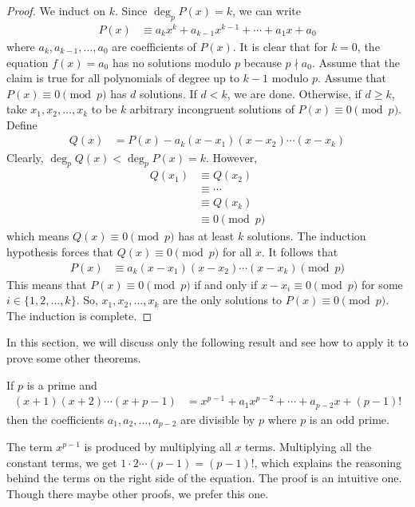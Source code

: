 	\begin{proof}
		We induct on $k$. Since $\deg_p P(x) = k$, we can write
			\begin{align*}
				P(x)
					& \equiv a_kx^k + a_{k-1}x^{k-1} + \cdots + a_1 x +a_0
			\end{align*}
		where $a_k, a_{k-1}, \ldots, a_0$ are coefficients of $P(x)$. It is clear that for $k=0$, the equation $f(x)=a_0$ has no solutions modulo $p$ because $p \nmid a_0$. Assume that the claim is true for all polynomials of degree up to $k-1$ modulo $p$. Assume that $P(x) \equiv 0 \pmod p$ has $d$ solutions. If $d < k$, we are done. Otherwise, if $d\geq k$, take $x_1, x_2, \ldots, x_k$ to be $k$ arbitrary incongruent solutions of $P(x) \equiv 0 \pmod p$. Define
			\begin{align*}
				Q(x)
					& = P(x) - a_k(x-x_1)(x-x_2)\cdots (x-x_k)
			\end{align*}
		Clearly, $\deg_p Q(x) < \deg_p P(x)=k$. However,
			\begin{align*}
				Q(x_1)
					& \equiv Q(x_2)\\
					& \equiv \cdots \\
					& \equiv Q(x_k)\\
					& \equiv 0 \pmod p
			\end{align*}
		which means $Q(x) \equiv 0 \pmod p$ has at least $k$ solutions. The induction hypothesis forces that $Q(x) \equiv 0 \pmod p$ for all $x$. It follows that
			\begin{align*}
				P(x)
					& \equiv a_k(x-x_1)(x-x_2)\cdots (x-x_k) \pmod p
			\end{align*}
		This means that $P(x) \equiv 0 \pmod p$ if and only if $x-x_i \equiv 0 \pmod p$ for some $i \in \{1,2,\ldots, k\}$. So, $x_1, x_2, \ldots, x_k$ are the only solutions to $P(x) \equiv 0 \pmod p$. The induction is complete.
	\end{proof}


In this section, we will discuss only the following result and see how to apply it to prove some other theorems.
	\begin{theorem}[Lagrange]
		If $p$ is a prime and\label{thm:lag2}
			\begin{align}\label{eq:lagrangeproof0}
				(x+1)(x+2)\cdots(x+p-1) & = x^{p-1}+a_1x^{p-2}+\cdots+a_{p-2}x+(p-1)!
			\end{align}
		then the coefficients $a_1,a_2, \ldots,a_{p-2}$ are divisible by $p$ where $p$ is an odd prime.
	\end{theorem}

The term $x^{p-1}$ is produced by multiplying all $x$ terms. Multiplying all the constant terms, we get $1\cdot2\cdots(p-1)=(p-1)!$, which explains the reasoning behind the terms on the right side of the equation. The proof is an intuitive one. Though there maybe other proofs, we prefer this one.

